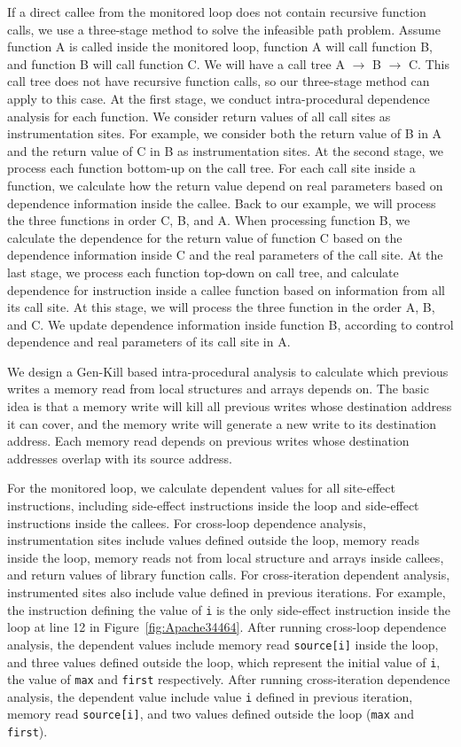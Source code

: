 {{If a direct callee from the monitored loop does not contain recursive function calls, 
we use a three-stage method to solve the infeasible path problem. 
Assume function A is called inside the monitored loop, function A will call function B, 
and function B will call function C. 
We will have a call tree A $\rightarrow$ B $\rightarrow$ C. 
This call tree does not have recursive function calls, so our three-stage method can apply to this case. 
At the first stage, we conduct intra-procedural dependence analysis for each function.  
We consider return values of all call sites as instrumentation sites. 
For example, we consider both the return value of B in A and the return value of C in B as instrumentation sites. 
At the second stage, we process each function bottom-up on the call tree. 
For each call site inside a function, we calculate 
how the return value depend on real parameters based on dependence information inside the callee.
Back to our example, we will process the three functions in order C, B, and A.
When processing function B, we calculate the dependence for the return value of function C 
based on the dependence information inside C and the real parameters of the call site.
At the last stage, we process each function top-down on call tree, 
and calculate dependence for instruction inside a callee function based on information from all its call site. 
At this stage, we will process the three function in the order A, B, and C. 
We update dependence information inside function B, according to control dependence and real parameters of its call site in A. 

We design a Gen-Kill based intra-procedural analysis to 
calculate which previous writes a memory read from local structures and arrays depends on. 
The basic idea is that a memory write will kill all previous writes whose destination address it can cover, 
and the memory write will generate a new write to its destination address. 
Each memory read depends on previous writes whose destination addresses overlap with its source address. 

For the monitored loop, we calculate dependent values for all site-effect instructions, 
including side-effect instructions inside the loop and side-effect instructions inside the callees. 
For cross-loop dependence analysis, instrumentation sites include values defined outside the loop, 
memory reads inside the loop, memory reads not from local structure and arrays inside callees, 
and return values of library function calls. 
For cross-iteration dependent analysis, instrumented sites also include value defined in previous iterations. 
For example, the instruction defining the value of \texttt{i} is the only side-effect instruction 
inside the loop at line 12 in Figure~\ref{fig:Apache34464}. 
After running cross-loop dependence analysis, the dependent values include 
memory read \texttt{source[i]} inside the loop, 
and three values defined outside the loop, 
which represent the initial value of \texttt{i}, the value of \texttt{max} and \texttt{first} respectively. 
After running cross-iteration dependence analysis, 
the dependent value include value \texttt{i} defined in previous iteration, 
memory read \texttt{source[i]}, 
and two values defined outside the loop (\texttt{max} and \texttt{first}).  

}

}
